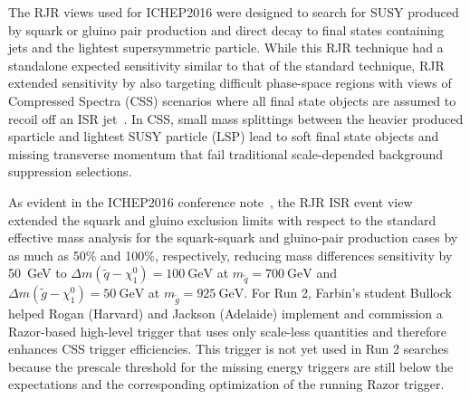 
The RJR views used for ICHEP2016
were designed to search for SUSY produced by squark or gluino pair
production and direct decay to final states containing jets and the
lightest supersymmetric particle. While this RJR technique had a
standalone expected sensitivity similar to that of the standard
technique, RJR extended sensitivity by also targeting difficult
phase-space regions with views of Compressed Spectra (CSS) scenarios
where all final state objects are assumed to recoil off an ISR
jet~\cite{Jackson:2016mfb}. In CSS, small mass splittings between the
heavier produced sparticle and lightest SUSY particle (LSP) lead to
soft final state objects and missing transverse momentum that fail
traditional scale-depended background suppression selections.

As evident in the ICHEP2016 conference
note~\cite{ATLAS-CONF-2016-078}, the RJR ISR event view extended the
squark and gluino exclusion limits with respect to the standard
effective mass analysis for the squark-squark and gluino-pair
production cases by as much as 50\% and 100\%, respectively, reducing
mass differences sensitivity by 50~GeV to $\Delta m(\tilde{q} -
\chi_1^0) = 100~\mathrm{GeV}$ at $m_{\tilde{q}} = 700~\mathrm{GeV}$  and 
$\Delta m(\tilde{g} -\chi_1^0) = 50~\mathrm{GeV}$ at $m_{\tilde{g}} =
925~\mathrm{GeV}$. For Run 2, Farbin's student Bullock helped Rogan
(Harvard) and Jackson (Adelaide) implement and commission a
Razor-based high-level trigger that uses only scale-less quantities
and therefore enhances CSS trigger efficiencies. This trigger is not
yet used in Run 2 searches because the prescale threshold for the
missing energy triggers are still below the expectations and the
corresponding optimization of the running Razor trigger.




